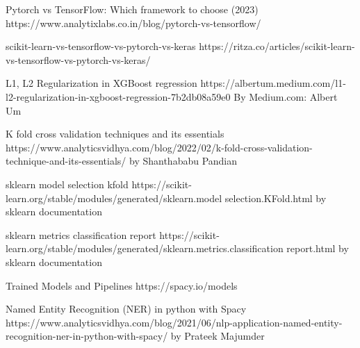\documentclass[11pt, a4paper]{article}
\begin{document}
\begin{thebibliography}{9}
Pytorch vs TensorFlow: Which framework to choose (2023)
https://www.analytixlabs.co.in/blog/pytorch-vs-tensorflow/

scikit-learn-vs-tensorflow-vs-pytorch-vs-keras
https://ritza.co/articles/scikit-learn-vs-tensorflow-vs-pytorch-vs-keras/

L1, L2 Regularization in XGBoost regression
https://albertum.medium.com/l1-l2-regularization-in-xgboost-regression-7b2db08a59e0
By Medium.com: Albert Um

K fold cross validation techniques and its essentials
https://www.analyticsvidhya.com/blog/2022/02/k-fold-cross-validation-technique-and-its-essentials/
by Shanthababu Pandian

sklearn model selection kfold
https://scikit-learn.org/stable/modules/generated/sklearn.model selection.KFold.html
by sklearn documentation

sklearn metrics classification report
https://scikit-learn.org/stable/modules/generated/sklearn.metrics.classification report.html
by sklearn documentation

Trained Models and Pipelines 
https://spacy.io/models

Named Entity Recognition (NER) in python with Spacy
https://www.analyticsvidhya.com/blog/2021/06/nlp-application-named-entity-recognition-ner-in-python-with-spacy/
by Prateek Majumder

\end{thebibliography}
\end{document}
